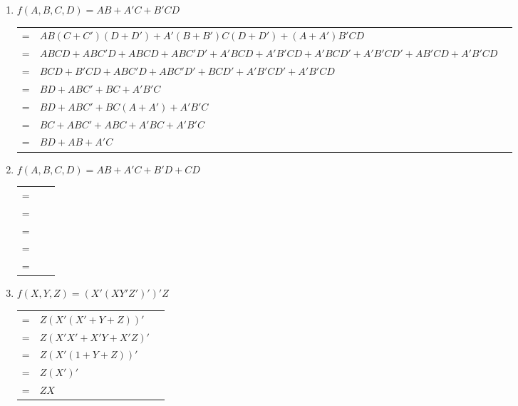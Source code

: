 \documentclass[12pt]{article}
\begin{document}
\begin{enumerate}
    \pagebreak
    
    \item $f(A, B, C, D) = AB + A'C + B'CD$ \\
    \begin{tabular}{r l l}
        = & $AB(C + C')(D + D') + A'(B + B')C(D + D') + (A + A')B'CD$ & \\
        = & $ABCD + ABC'D + ABCD + ABC'D' + A'BCD + A'B'CD + A'BCD' + A'B'CD' + AB'CD + A'B'CD$ & \\
        = & $BCD + B'CD + ABC'D + ABC'D' + BCD' + A'B'CD' + A'B'CD$ & \\
        = & $BD + ABC' + BC + A'B'C$ & \\
        = & $BD + ABC' + BC(A + A') + A'B'C$ & \\
        = & $BC + ABC' + ABC + A'BC + A'B'C$ & \\
        = & $BD + AB + A'C$ & \\
    \end{tabular}
    
    \pagebreak
    
    \item $f(A, B, C, D) = AB + A'C + B'D + CD$ \\
    \begin{tabular}{r l l}
        = & $ $ & \\
        = & $ $ & \\
        = & $ $ & \\
        = & $ $ & \\
        = & $ $ & \\
    \end{tabular}
    
    \pagebreak
    
    \item $f(X, Y, Z) = (X'(XY'Z')')'Z$ \\
    \begin{tabular}{r l l}
        = & $Z(X'(X' + Y + Z))'$ & \\
        = & $Z(X'X' + X'Y + X'Z)'$ & \\
        = & $Z(X'(1 + Y + Z))'$ & \\
        = & $Z(X')'$ & \\
        = & $ZX$ & \\
    \end{tabular}

\end{enumerate}
\end{document}

